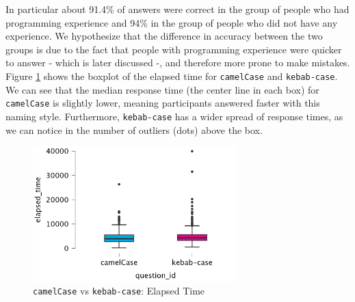 \documentclass[unicode,11pt,a4paper,oneside,numbers=endperiod,openany]{scrartcl}
\begin{document}
In particular about 91.4\% of answers were correct in the group of people who had programming experience and 94\% in the group of people who did not have any experience. We hypothesize that the difference in accuracy between the two groups is due to the fact that people with programming experience were quicker to answer - which is later discussed -, and therefore more prone to make mistakes. \\

Figure \ref{fig:boxplot} shows the boxplot of the elapsed time for \texttt{camelCase} and \texttt{kebab-case}. We can see that the median response time (the center line in each box) for \texttt{camelCase} is slightly lower, meaning participants answered faster with this naming style. Furthermore, \texttt{kebab-case} has a wider spread of response times, as we can notice in the number of outliers (dots) above the box.

\begin{figure}[h!]
    \centering
    \includegraphics[width=0.7\textwidth]{./figures/elapsed_time_correct.png}
    \caption{\texttt{camelCase} vs \texttt{kebab-case}: Elapsed Time}
    \label{fig:boxplot}
\end{figure}
\end{document}

